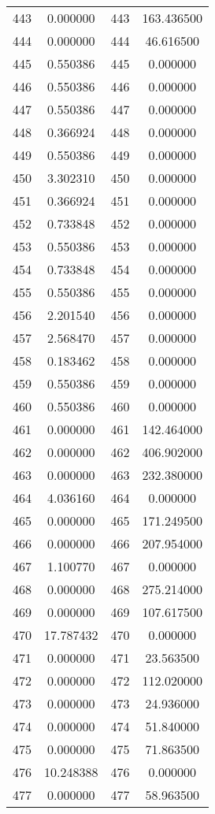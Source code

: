 \documentclass[12pt]{article}
\begin{document}
\begin{longtable}{@{}cccc@{}}
443 & 0.000000 & 443 & 163.436500 \\
444 & 0.000000 & 444 & 46.616500 \\
445 & 0.550386 & 445 & 0.000000 \\
446 & 0.550386 & 446 & 0.000000 \\
447 & 0.550386 & 447 & 0.000000 \\
448 & 0.366924 & 448 & 0.000000 \\
449 & 0.550386 & 449 & 0.000000 \\
450 & 3.302310 & 450 & 0.000000 \\
451 & 0.366924 & 451 & 0.000000 \\
452 & 0.733848 & 452 & 0.000000 \\
453 & 0.550386 & 453 & 0.000000 \\
454 & 0.733848 & 454 & 0.000000 \\
455 & 0.550386 & 455 & 0.000000 \\
456 & 2.201540 & 456 & 0.000000 \\
457 & 2.568470 & 457 & 0.000000 \\
458 & 0.183462 & 458 & 0.000000 \\
459 & 0.550386 & 459 & 0.000000 \\
460 & 0.550386 & 460 & 0.000000 \\
461 & 0.000000 & 461 & 142.464000 \\
462 & 0.000000 & 462 & 406.902000 \\
463 & 0.000000 & 463 & 232.380000 \\
464 & 4.036160 & 464 & 0.000000 \\
465 & 0.000000 & 465 & 171.249500 \\
466 & 0.000000 & 466 & 207.954000 \\
467 & 1.100770 & 467 & 0.000000 \\
468 & 0.000000 & 468 & 275.214000 \\
469 & 0.000000 & 469 & 107.617500 \\
470 & 17.787432 & 470 & 0.000000 \\
471 & 0.000000 & 471 & 23.563500 \\
472 & 0.000000 & 472 & 112.020000 \\
473 & 0.000000 & 473 & 24.936000 \\
474 & 0.000000 & 474 & 51.840000 \\
475 & 0.000000 & 475 & 71.863500 \\
476 & 10.248388 & 476 & 0.000000 \\
477 & 0.000000 & 477 & 58.963500 \\

\end{longtable}
\end{document}
